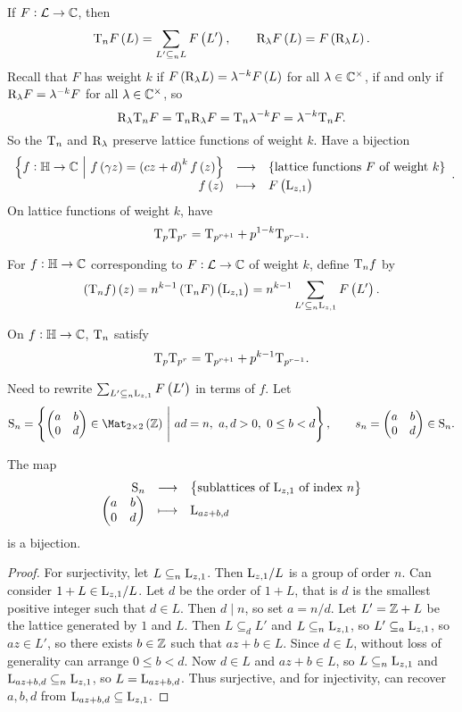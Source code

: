 
If $ F : \mathcal{L} \to \mathbb{C} $, then
$$ \T_nF\br{L} = \sum_{L' \subseteq_n L} F\br{L'}, \qquad \R_\lambda F\br{L} = F\br{\R_\lambda L}. $$
Recall that $ F $ has weight $ k $ if $ F\br{\R_\lambda L} = \lambda^{-k}F\br{L} $ for all $ \lambda \in \mathbb{C}^\times $, if and only if $ \mathrm{R}_\lambda F = \lambda^{-k}F $ for all $ \lambda \in \mathbb{C}^\times $, so
$$ \mathrm{R}_\lambda\mathrm{T}_nF = \mathrm{T}_n\mathrm{R}_\lambda F = \mathrm{T}_n\lambda^{-k}F = \lambda^{-k}\mathrm{T}_nF. $$
So the $ \mathrm{T}_n $ and $ \mathrm{R}_\lambda $ preserve lattice functions of weight $ k $. Have a bijection
$$ \function{\cbr{f : \HH \to \CC \st f\br{\gamma z} = \br{cz + d}^kf\br{z}}}{\cbr{\text{lattice functions} \ F \ \text{of weight} \ k}}{f\br{z}}{F\br{\L_{z, 1}}}. $$
On lattice functions of weight $ k $, have
$$ \mathrm{T}_p\mathrm{T}_{p^r} = \mathrm{T}_{p^{r + 1}} + p^{1 - k}\mathrm{T}_{p^{r - 1}}. $$

\begin{definition}
For $ f : \mathbb{H} \to \mathbb{C} $ corresponding to $ F : \mathcal{L} \to \mathbb{C} $ of weight $ k $, define $ \mathrm{T}_nf $ by
$$ \br{\T_nf}\br{z} = n^{k - 1}\br{\T_nF}\br{\L_{z, 1}} = n^{k - 1}\sum_{L' \subseteq_n \L_{z, 1}} F\br{L'}. $$
\end{definition}

On $ f : \mathbb{H} \to \mathbb{C} $, $ \mathrm{T}_n $ satisfy
$$ \mathrm{T}_p\mathrm{T}_{p^r} = \mathrm{T}_{p^{r + 1}} + p^{k - 1}\mathrm{T}_{p^{r - 1}}. $$

\pagebreak

Need to rewrite $ \sum_{L' \subseteq_n \L_{z, 1}} F\br{L'} $ in terms of $ f $. Let
$$ \S_n = \cbr{\twobytwo{a}{b}{0}{d} \in \Mat_{2 \times 2}\br{\ZZ} \st ad = n, \ a, d > 0, \ 0 \le b < d}, \qquad s_n = \twobytwo{a}{b}{0}{d} \in \S_n. $$

\begin{lemma}
The map
$$ \function{\S_n}{\cbr{\text{sublattices of} \ \L_{z, 1} \ \text{of index} \ n}}{\twobytwo{a}{b}{0}{d}}{\L_{az + b, d}} $$
is a bijection.
\end{lemma}

\begin{proof}
For surjectivity, let $ L \subseteq_n \mathrm{L}_{z, 1} $. Then $ \mathrm{L}_{z, 1} / L $ is a group of order $ n $. Can consider $ 1 + L \in \mathrm{L}_{z, 1} / L $. Let $ d $ be the order of $ 1 + L $, that is $ d $ is the smallest positive integer such that $ d \in L $. Then $ d \mid n $, so set $ a = n / d $. Let $ L' = \mathbb{Z} + L $ be the lattice generated by $ 1 $ and $ L $. Then $ L \subseteq_d L' $ and $ L \subseteq_n \mathrm{L}_{z, 1} $, so $ L' \subseteq_a \mathrm{L}_{z, 1} $, so $ az \in L' $, so there exists $ b \in \mathbb{Z} $ such that $ az + b \in L $. Since $ d \in L $, without loss of generality can arrange $ 0 \le b < d $. Now $ d \in L $ and $ az + b \in L $, so $ L \subseteq_n \mathrm{L}_{z, 1} $ and $ \mathrm{L}_{az + b, d} \subseteq_n \mathrm{L}_{z, 1} $, so $ L = \mathrm{L}_{az + b, d} $. Thus surjective, and for injectivity, can recover $ a, b, d $ from $ \mathrm{L}_{az + b, d} \subseteq \mathrm{L}_{z, 1} $.
\end{proof}

